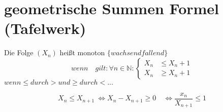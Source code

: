 \section{geometrische Summen Formel (Tafelwerk)}
\begin{definition}

    Die Folge $(X_n)$ heißt monoton $\Big\{ wachsend fallend \Big\}$
    \[ wenn \quad gilt: \forall n \in \mathbb{N}:
    \left\{
    \begin{array}{ll}
        X_n  & \leq X_n +1 \\
        X_n  & \geq X_n+1
    \end{array}
    \right. \]
    $ wenn \leq durch > und \geq durch < \dots  $
\end{definition}
\begin{remark}
    \[ X_n \leq X_{n+1} \ \Leftrightarrow  X_n - X_{n+1} \geq 0 \quad \Leftrightarrow  \frac{x_n}{X_{n+1}} \leq 1 \]
\end{remark}

